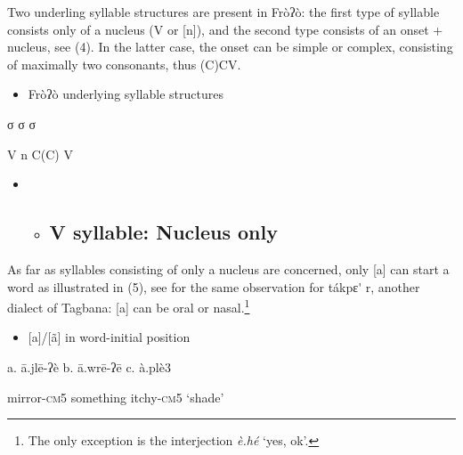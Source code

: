 Two underling syllable structures are present in Fròʔò: the first type of syllable consists only of a nucleus (V or [n]), and the second type consists of an onset + nucleus, see (4). In the latter case, the onset can be simple or complex, consisting of maximally two consonants, thus (C)CV.

\begin{itemize}
\item \begin{styleindexi}
    \label{bkm:Ref475745330}Fròʔò underlying syllable structures 
\end{styleindexi}\end{itemize}

              σ                     σ                 σ

     {\textbar}        {\textbar}

             V                      n                 C(C)       V

\begin{itemize}
\item \begin{itemize}
\item \subsection{ V syllable: Nucleus only}\end{itemize}
\end{itemize}

As far as syllables consisting of only a nucleus are concerned, only [a] can start a word as illustrated in (5), see \citet{HeraultMlanhoro1973} for the same observation for tákpɛ\'{} r, another dialect of Tagbana: [a] can be oral or nasal.\footnote{The only exception is the interjection \textit{è.hé} ‘yes, ok’.} 

\begin{itemize}
\item \begin{styleindexi}
     \label{bkm:Ref359766976}[a]/[ã] in word-initial position                
\end{styleindexi}\end{itemize}
\begin{styleindexi}
  a.   ā.jlē-ʔè                      b.   ā.wrē-ʔē                       c. à.plè3
\end{styleindexi}

\begin{styleindexi}
      mirror-\textsc{cm5}                   something itchy-\textsc{cm5}           ‘shade’
\end{styleindexi}

